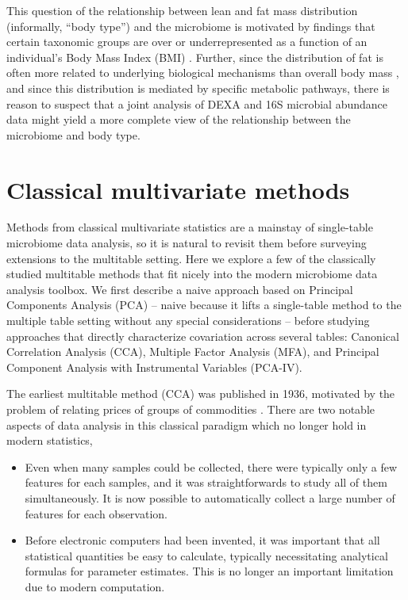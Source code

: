 \documentclass[utf8]{frontiersFPHY} %
\begin{document}
This question of the relationship between lean and fat mass distribution
(informally, ``body type'') and the microbiome is motivated by findings that
certain taxonomic groups are over or underrepresented as a function of an
individual's Body Mass Index (BMI) \citep{ley2006microbial, turnbaugh2009core,
  ley2005obesity, ley2010obesity}. Further, since the distribution of fat is
often more related to underlying biological mechanisms than overall body mass
\citep{matsuzawa2008role}, and since this distribution is mediated by specific
metabolic pathways, there is reason to suspect that a joint analysis of DEXA and
16S microbial abundance data might yield a more complete view of the
relationship between the microbiome and body type.

\section{Classical multivariate methods}

Methods from classical multivariate statistics are a mainstay of single-table
microbiome data analysis, so it is natural to revisit them before surveying
extensions to the multitable setting. Here we explore a few of the classically
studied multitable methods that fit nicely into the modern microbiome data
analysis toolbox. We first describe a naive approach based on Principal
Components Analysis (PCA) -- naive because it lifts a single-table method to the
multiple table setting without any special considerations -- before studying
approaches that directly characterize covariation across several tables:
Canonical Correlation Analysis (CCA), Multiple Factor Analysis (MFA), and
Principal Component Analysis with Instrumental Variables (PCA-IV).

The earliest multitable method (CCA) was published in 1936, motivated by the
problem of relating prices of groups of commodities
\citep{hotelling1936relations}. There are two notable aspects of data analysis
in this classical paradigm which no longer hold in modern statistics,
\begin{itemize}
  \item Even when many samples could be collected, there were typically
    only a few features for each samples, and it was straightforwards to study
    all of them simultaneously. It is now possible to automatically collect a
    large number of features for each observation.
  \item Before electronic computers had been invented, it was important that all
    statistical quantities be easy to calculate, typically necessitating
    analytical formulas for parameter estimates. This is no longer an important
    limitation due to modern computation.
\end{itemize}
\end{document}
